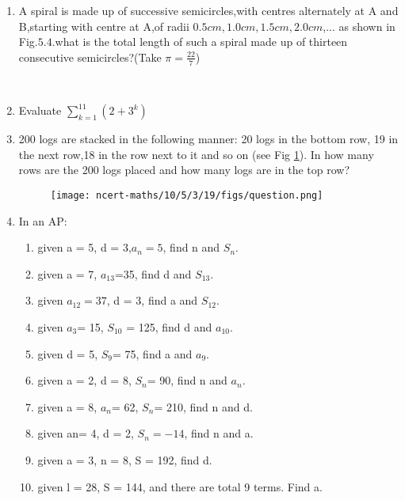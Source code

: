 \begin{enumerate}[label=\thechapter.\arabic*,ref=\thechapter.\theenumi]
\item A spiral is made up of successive semicircles,with centres alternately at A and B,starting with centre at A,of radii $0.5cm,1.0cm,1.5cm,2.0cm$,... as shown in Fig.$5.4$.what is the total length of such a spiral made up of thirteen consecutive semicircles?(Take $\pi=\frac{22}{7}$)\\
\\
\solution
\pagebreak
\item Evaluate $\sum_{k=1}^{11} (2 + 3^k)$\\
\solution
\pagebreak

\item 200 logs are stacked in the following manner: 20 logs in the bottom row, 19 in the next row,18 in the row next to it and so on (see Fig \ref{fig:10.5.3.19.q}). In how many rows are the 200 logs placed and how many logs are in the top row?
\begin{figure}[h]
    \centering
    \texttt{[image: ncert-maths/10/5/3/19/figs/question.png]}
    \caption{ }
    \label{fig:10.5.3.19.q}
\end{figure}
\solution 
\pagebreak

\item In an AP:
\begin{enumerate}
\item given a = 5, d = 3,$a_n=5$, find n and $S_n$.
\item given a = 7, $a_{13}$=35, find d and $S_{13}$.
\item given $a_{12}=37$, d = 3, find a and $S_{12}$.
\item given $a_3$= 15, $S_{10}$ = 125, find d and $a_{10}$.
\item given d = 5, $S_9$= 75, find a and $a_9$.
\item given a = 2, d = 8, $S_n$= 90, find n and $a_n$.
\item given a = 8, $a_n$= 62, $S_n$= 210, find n and d.
\item given an= 4, d = 2, $S_n=-14$, find n and a.
\item given a = 3, n = 8, S = 192, find d.
\item given l = 28, S = 144, and there are total 9 terms. Find a.\\
\end{enumerate}
\solution
\pagebreak


\end{enumerate}
